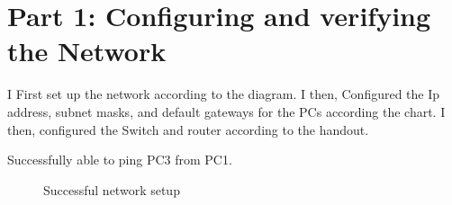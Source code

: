 \documentclass{report}
\title{\classinfo}
\author{\semester}
\date{\today}
\newcommand{\mysection}[1]{\section*{#1}}
\begin{document}
\maketitle

\mysection{\textbf{Part 1: Configuring and verifying the Network}}

I First set up the network according to the diagram.
I then, Configured the Ip address, subnet masks, and default gateways for the
PCs according the chart.
I then, configured the Switch and router according to the handout.

Successfully able to ping PC3 from PC1.


\begin{figure}[!hbt]\centering
{}\par
{}\par
\caption{Successful network setup}
\label{success15}
\end{figure}








\end{document}
